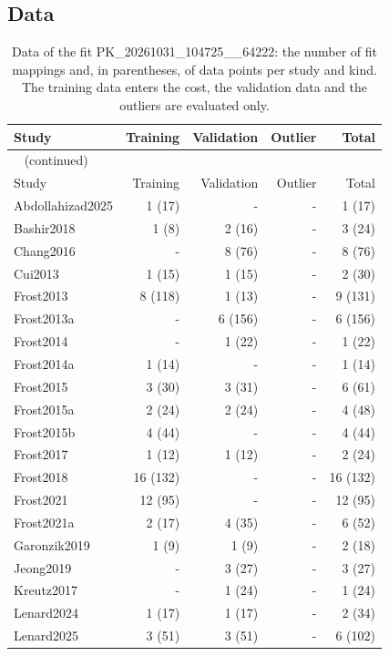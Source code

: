 \subsection{Data}

\begin{longtable}{lrrrr}
\caption{Data of the fit PK\_20261031\_104725\_\_64222: the number of fit mappings and, in parentheses, of data points per study and kind. The training data enters the cost, the validation data and the outliers are evaluated only.}\label{tab:data:PK_20261031_104725__64222} \\
\toprule
Study & Training & Validation & Outlier & Total \\
\midrule
\endfirsthead
\multicolumn{5}{l}{\small\tablename~\thetable{} (continued)} \\
\toprule
Study & Training & Validation & Outlier & Total \\
\midrule
\endhead
\bottomrule
\endlastfoot
Abdollahizad2025 & 1 (17) & - & - & 1 (17) \\
Bashir2018 & 1 (8) & 2 (16) & - & 3 (24) \\
Chang2016 & - & 8 (76) & - & 8 (76) \\
Cui2013 & 1 (15) & 1 (15) & - & 2 (30) \\
Frost2013 & 8 (118) & 1 (13) & - & 9 (131) \\
Frost2013a & - & 6 (156) & - & 6 (156) \\
Frost2014 & - & 1 (22) & - & 1 (22) \\
Frost2014a & 1 (14) & - & - & 1 (14) \\
Frost2015 & 3 (30) & 3 (31) & - & 6 (61) \\
Frost2015a & 2 (24) & 2 (24) & - & 4 (48) \\
Frost2015b & 4 (44) & - & - & 4 (44) \\
Frost2017 & 1 (12) & 1 (12) & - & 2 (24) \\
Frost2018 & 16 (132) & - & - & 16 (132) \\
Frost2021 & 12 (95) & - & - & 12 (95) \\
Frost2021a & 2 (17) & 4 (35) & - & 6 (52) \\
Garonzik2019 & 1 (9) & 1 (9) & - & 2 (18) \\
Jeong2019 & - & 3 (27) & - & 3 (27) \\
Kreutz2017 & - & 1 (24) & - & 1 (24) \\
Lenard2024 & 1 (17) & 1 (17) & - & 2 (34) \\
Lenard2025 & 3 (51) & 3 (51) & - & 6 (102) \\

\end{longtable}

